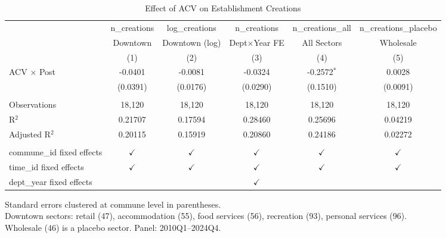 
\begin{table}[htbp]
   \caption{\label{tab:main} Effect of ACV on Establishment Creations}
   \bigskip
   \centering
   \begin{tabular}{lccccc}
      \toprule
                                 & n\_creations  & log\_creations  & n\_creations  & n\_creations\_all   & n\_creations\_placebo\\    
                                 & Downtown      & Downtown (log)  & Dept×Year FE  & All Sectors         & Wholesale \\   
                                 & (1)           & (2)             & (3)           & (4)                 & (5)\\  
      \midrule 
      ACV × Post                 & -0.0401       & -0.0081         & -0.0324       & -0.2572$^{*}$       & 0.0028\\   
                                 & (0.0391)      & (0.0176)        & (0.0290)      & (0.1510)            & (0.0091)\\   
       \\
      Observations               & 18,120        & 18,120          & 18,120        & 18,120              & 18,120\\  
      R$^2$                      & 0.21707       & 0.17594         & 0.28460       & 0.25696             & 0.04219\\  
      Adjusted R$^2$             & 0.20115       & 0.15919         & 0.20860       & 0.24186             & 0.02272\\  
       \\
      commune\_id fixed effects  & $\checkmark$  & $\checkmark$    & $\checkmark$  & $\checkmark$        & $\checkmark$\\   
      time\_id fixed effects     & $\checkmark$  & $\checkmark$    & $\checkmark$  & $\checkmark$        & $\checkmark$\\   
      dept\_year fixed effects   &               &                 & $\checkmark$  &                     & \\  
      \bottomrule
   \end{tabular}
   
   \par \raggedright 
   Standard errors clustered at commune level in parentheses.\\
   Downtown sectors: retail (47), accommodation (55), food services (56), recreation (93), personal services (96).\\
   Wholesale (46) is a placebo sector. Panel: 2010Q1--2024Q4.
\end{table}


